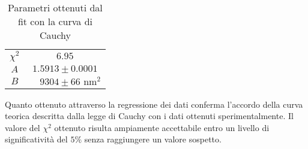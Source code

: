 \documentclass[9pt,a4paper,twocolumn,twoside]{tau-class/tau}
\begin{document}
%
\begin{table}[H]
            \centering
            \begin{tabular}{cc}
                \toprule
                $\chi^2$ & \(6.95\) \\
                $A$ & $1.5913 \pm 0.0001$ \\
                $B$ & $\;\;\;\;9304 \pm 66 \text{ nm}^2$\\
                \bottomrule   
            \end{tabular}
            \caption{Parametri ottenuti dal fit con la curva di Cauchy}
\end{table}

Quanto ottenuto attraverso la regressione dei dati conferma l'accordo della curva teorica descritta dalla legge di Cauchy con i dati ottenuti sperimentalmente. Il valore del $\chi^2$ ottenuto risulta ampiamente accettabile entro un livello di significatività del $5\%$ senza raggiungere un valore sospetto. %
 

\end{document}
